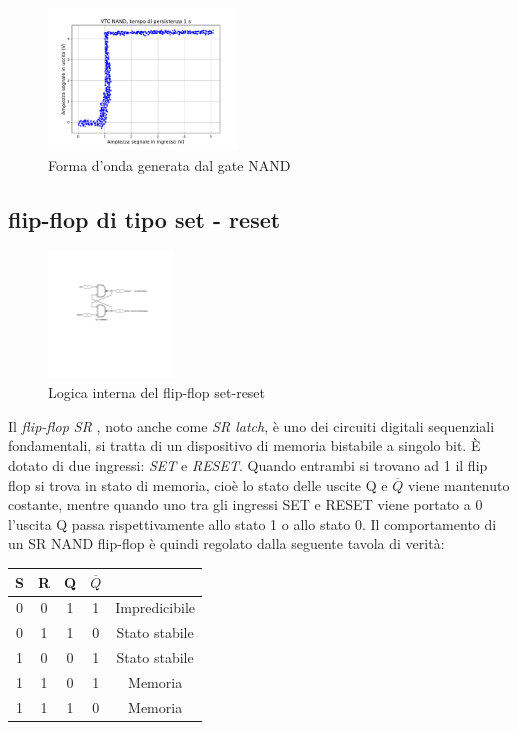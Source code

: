 \documentclass[journal]{IEEEtran}
\begin{document}
\begin{figure}[H]%
\begin{center}
\includegraphics[width=0.45\textwidth]{analysis/output/NAND-XY.pdf}
\caption{Forma d'onda generata dal gate NAND}
\label{fig:VTC NAND gate}
\end{center}
\end{figure}


\subsection{flip-flop di tipo set - reset}
\begin{figure}[H]%
\begin{center}
\includegraphics[width=0.30\textwidth]{sch-simulations/digital/output/flip-flop-RS.pdf}
\caption{Logica interna del flip-flop set-reset}
\label{fig:circuit_flip_flop}
\end{center}
\end{figure}
Il \textit{flip-flop SR }, noto  anche come \textit{SR latch}, è uno dei circuiti digitali sequenziali fondamentali, si tratta di un dispositivo di memoria bistabile a singolo bit. È dotato di due ingressi: \textit{SET} e \textit{RESET}. Quando entrambi si trovano ad 1 il flip flop si trova in stato di memoria, cioè lo stato delle uscite Q e $ \overline{Q}$ viene mantenuto costante, mentre quando uno tra gli ingressi SET e RESET viene portato a 0 l'uscita Q passa rispettivamente allo stato 1 o allo stato 0.
Il comportamento di un SR NAND flip-flop è quindi regolato dalla seguente tavola di verità:
\begin{center}
\begin{tabular}{ |c|c|c|c|c| } 
 \hline
 \rowcolor{lightgray}
S & R & Q & $\overline{Q}$ &\\ \hline \hline
 0 & 0 & 1 & 1 & Impredicibile\\  \hline
 0 & 1 & 1 & 0 & Stato stabile\\ \hline
 1 & 0 & 0 & 1 & Stato stabile\\ \hline
 1 & 1 & 0 & 1 & Memoria\\ \hline
 1 & 1 & 1 & 0 & Memoria\\ \hline
 
 \hline
\end{tabular}
\end{center}
\end{document}
